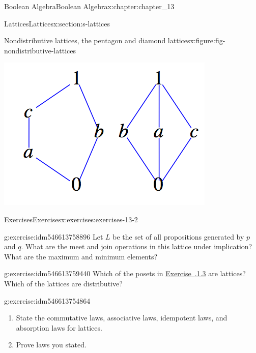 \documentclass[oneside,10pt,]{book}
\newcommand{\xreffont}{\relax}
\numberwithin{equation}{section}
\begin{document}
\begin{chapterptx}{Boolean Algebra}{}{Boolean Algebra}{}{}{x:chapter:chapter_13}
\begin{sectionptx}{Lattices}{}{Lattices}{}{}{x:section:s-lattices}
\begin{figureptx}{Nondistributive lattices, the pentagon and diamond lattices}{x:figure:fig-nondistributive-lattices}{}%
\begin{image}{0.25}{0.5}{0.25}%
\includegraphics[width=\linewidth]{images/fig-nondistributive-lattices.png}
\end{image}%
\tcblower
\end{figureptx}%
%
%
\typeout{************************************************}
\typeout{************************************************}
%
\begin{exercises-subsection}{Exercises}{}{Exercises}{}{}{x:exercises:exercises-13-2}
\begin{divisionexercise}{1}{}{}{g:exercise:idm546613758896}%
Let \(L\) be the set of all propositions generated by \(p\) and \(q\).  What are the meet and join operations in this lattice under implication?   What are the maximum and minimum elements?%
\end{divisionexercise}%
\begin{divisionexercise}{2}{}{}{g:exercise:idm546613759440}%
Which of the posets in \hyperlink{x:exercise:exercise-13-1-3}{Exercise~{\xreffont 13.1.1.3}} are lattices? Which of the lattices are distributive?%
\end{divisionexercise}%
\begin{divisionexercise}{3}{}{}{g:exercise:idm546613754864}%
%
\begin{enumerate}[label=(\alph*)]
\item{}State the commutative laws, associative laws, idempotent laws, and absorption laws for lattices.%
\item{}Prove laws you stated.%

\end{enumerate}
\end{divisionexercise}
\end{exercises-subsection}
\end{sectionptx}
\end{chapterptx}
\end{document}
